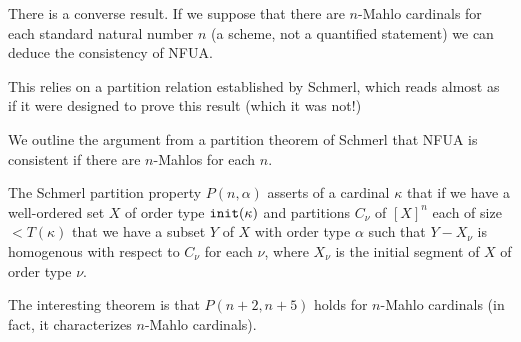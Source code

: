\documentclass{slides}
\begin{document}
\begin{slide}

There is a converse result.  If we suppose that there are $n$-Mahlo cardinals for each standard natural number $n$ (a scheme, not a quantified statement) we can deduce the consistency of NFUA.

This relies on a partition relation established by Schmerl, which reads almost as if it were designed to prove this result (which it was not!)


We outline the argument from a partition theorem of Schmerl that NFUA is consistent if there are $n$-Mahlos for each $n$.

\end{slide}

\begin{slide}

The Schmerl partition property $P(n,\alpha)$ asserts of a cardinal $\kappa$ that if we have a well-ordered set $X$ of order type ${\tt init}(\kappa)$ and partitions $C_{\nu}$ of $[X]^n$ each of size $<T(\kappa)$  that we have a subset $Y$ of $X$ with order type $\alpha$ such that $Y-X_{\nu}$ is homogenous with respect to $C_\nu$ for each $\nu$, where $X_\nu$ is the initial segment of $X$ of order type $\nu$.

The interesting theorem is that $P(n+2,n+5)$ holds for $n$-Mahlo cardinals (in fact, it characterizes $n$-Mahlo cardinals).

\end{slide}
\end{document}
